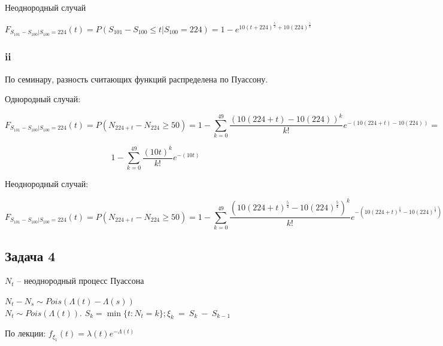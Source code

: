 \documentclass[a4paper,12pt]{article}
\begin{document}
Неоднородный случай

$$ F_{S_{101} - S_{100}|S_{100} = 224}(t) = P(S_{101} - S_{100} \le t|S_{100} = 224) = 1 - e^{10(t + 224)^{\frac{5}{4}} + 10(224)^{\frac{5}{4}}}$$


\subsubsection{ii}
По семинару, разность считающих функций распределена по Пуассону. 

Однородный случай:

$$  F_{S_{101} - S_{100}|S_{100} = 224}(t) = P(N_{224+t} - N_{224} \ge 50) = 1 - \sum_{k=0}^{49} \frac{(10(224+t) - 10(224))^k}{k!} e^{-(10(224+t) - 10(224))} =$$

$$ 1 - \sum_{k=0}^{49} \frac{(10t)^k}{k!} e^{-(10t)}$$

Неоднородный случай:

$$  F_{S_{101} - S_{100}|S_{100} = 224}(t) = P(N_{224+t} - N_{224} \ge 50) = 1 - \sum_{k=0}^{49} \frac{(10(224+t)^{\frac{5}{4}} - 10(224)^{\frac{5}{4}})^k}{k!} e^{-(10(224+t)^{\frac{5}{4}} - 10(224)^{\frac{5}{4}})} $$


\subsection{Задача 4}

$N_t$ -- неоднородный процесс Пуассона

$ N_t - N_s \sim Pois(\Lambda(t) - \Lambda(s))$\\[-6mm]

$N_t \sim Pois(\Lambda(t))$. $S_k = \min\{t: N_t = k\}; \xi_k~=~S_k~-~S_{k-1}$

По лекции:
$f_{\xi_1}(t) = \lambda(t) e^{-\Lambda(t)}$
\end{document}
